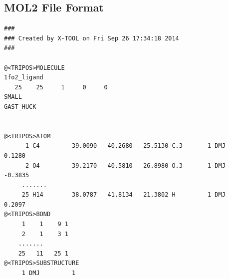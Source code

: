 \documentclass[11pt]{article}
\begin{document}
\subsection{MOL2 File Format}
\label{MOL2Fileexampleref}
\begin{verbatim}
### 
### Created by X-TOOL on Fri Sep 26 17:34:18 2014
### 

@<TRIPOS>MOLECULE
1fo2_ligand
   25    25     1     0     0
SMALL
GAST_HUCK


@<TRIPOS>ATOM
      1 C4         39.0090   40.2680   25.5130 C.3       1 DMJ         0.1280
      2 O4         39.2170   40.5810   26.8980 O.3       1 DMJ        -0.3835
     .......
     25 H14        38.0787   41.8134   21.3802 H         1 DMJ         0.2097
@<TRIPOS>BOND
     1    1    9 1  
     2    1    3 1  
    .......
    25   11   25 1  
@<TRIPOS>SUBSTRUCTURE
     1 DMJ         1
\end{verbatim}
\end{document}
